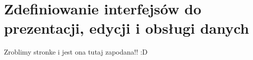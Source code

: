 \section{Zdefiniowanie interfejsów do prezentacji, edycji i obsługi danych}
Zroblimy stronke i jest ona tutaj zapodana!! :D